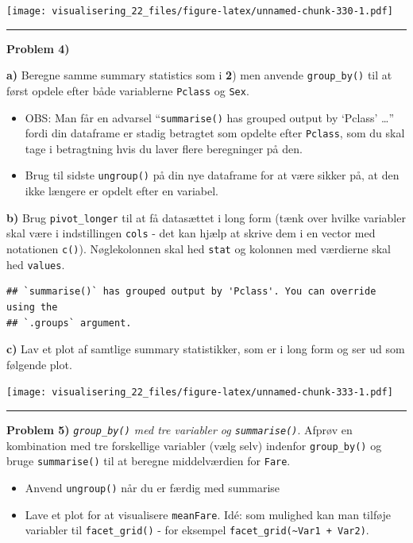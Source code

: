 \documentclass[
]{book}
\providecommand{\tightlist}{%
  \setlength{\itemsep}{0pt}\setlength{\parskip}{0pt}}
\begin{document}
\texttt{[image: visualisering\_22\_files/figure-latex/unnamed-chunk-330-1.pdf]}

\begin{center}\rule{0.5\linewidth}{0.5pt}\end{center}

\textbf{Problem 4)}

\textbf{a)} Beregne samme summary statistics som i \textbf{2}) men anvende \texttt{group\_by()} til at først opdele efter både variablerne \texttt{Pclass} og \texttt{Sex}.

\begin{itemize}
\tightlist
\item
  OBS: Man får en advarsel ``\texttt{summarise()} has grouped output by `Pclass' \ldots{}'' fordi din dataframe er stadig betragtet som opdelte efter \texttt{Pclass}, som du skal tage i betragtning hvis du laver flere beregninger på den.
\item
  Brug til sidste \texttt{ungroup()} på din nye dataframe for at være sikker på, at den ikke længere er opdelt efter en variabel.
\end{itemize}

\textbf{b)} Brug \texttt{pivot\_longer} til at få datasættet i long form (tænk over hvilke variabler skal være i indstillingen \texttt{cols} - det kan hjælp at skrive dem i en vector med notationen \texttt{c()}). Nøglekolonnen skal hed \texttt{stat} og kolonnen med værdierne skal hed \texttt{values}.

\begin{verbatim}
## `summarise()` has grouped output by 'Pclass'. You can override using the
## `.groups` argument.
\end{verbatim}

\textbf{c)} Lav et plot af samtlige summary statistikker, som er i long form og ser ud som følgende plot.

\texttt{[image: visualisering\_22\_files/figure-latex/unnamed-chunk-333-1.pdf]}

\begin{center}\rule{0.5\linewidth}{0.5pt}\end{center}

\textbf{Problem 5)} \emph{\texttt{group\_by()} med tre variabler og \texttt{summarise()}}. Afprøv en kombination med tre forskellige variabler (vælg selv) indenfor \texttt{group\_by()} og bruge \texttt{summarise()} til at beregne middelværdien for \texttt{Fare}.

\begin{itemize}
\tightlist
\item
  Anvend \texttt{ungroup()} når du er færdig med summarise
\item
  Lave et plot for at visualisere \texttt{meanFare}. Idé: som mulighed kan man tilføje variabler til \texttt{facet\_grid()} - for eksempel \texttt{facet\_grid(\textasciitilde{}Var1\ +\ Var2)}.
\end{itemize}
\end{document}
